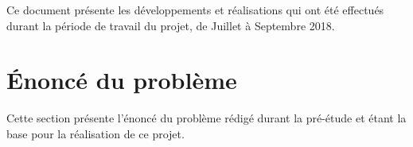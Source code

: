 Ce document présente les développements et réalisations qui ont été effectués durant la période de travail du projet, de Juillet à Septembre 2018.

\section{Énoncé du problème}

Cette section présente l'énoncé du problème rédigé durant la pré-étude et étant la base pour la réalisation de ce projet.

